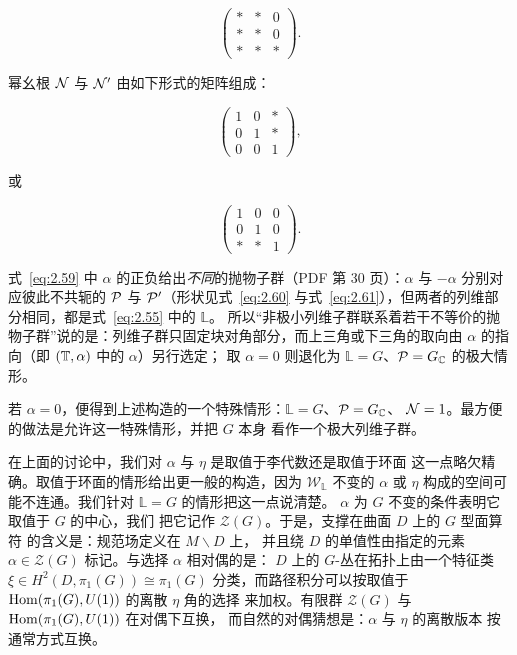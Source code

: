 \setcounter{equation}{60}
\begin{equation}\label{eq:2.61}
  \left(\begin{matrix}* & * & 0 \\
                        * & * & 0\\
                        * & * & * \end{matrix}\right).
\end{equation}

幂幺根 $\mathcal{N}$ 与 $\mathcal{N}'$ 由如下形式的矩阵组成：

\setcounter{equation}{61}
\begin{equation}\label{eq:2.62}
  \left(\begin{matrix}1 & 0 & * \\
                        0 & 1 & * \\
                        0 & 0 & 1 \end{matrix}\right),
\end{equation}

或

\setcounter{equation}{62}
\begin{equation}\label{eq:2.63}
  \left(\begin{matrix}1 & 0 & 0 \\
                        0 & 1 & 0 \\
                        * & * & 1 \end{matrix}\right).
\end{equation}

\begin{yizhu}[易错点]式~\eqref{eq:2.59} 中 $\alpha$ 的正负给出\emph{不同}的抛物子群（PDF 第 30 页）：$\alpha$ 与 $-\alpha$ 分别对应彼此不共轭的
$\mathcal{P}$ 与 $\mathcal{P}'$（形状见式~\eqref{eq:2.60} 与式~\eqref{eq:2.61}），但两者的列维部分相同，都是式~\eqref{eq:2.55} 中的 $\mathbb{L}$。
所以“非极小列维子群联系着若干不等价的抛物子群”说的是：列维子群只固定块对角部分，而上三角或下三角的取向由 $\alpha$ 的指向（即 $({\mathbb{T}},\alpha)$ 中的 $\alpha$）另行选定；
取 $\alpha=0$ 则退化为 $\mathbb{L}=G$、$\mathcal{P}=G_{\mathbb{C}}$ 的极大情形。\end{yizhu}

\bigskip{}

若 $\alpha=0$，便得到上述构造的一个特殊情形：$\mathbb{L}=G$、$\mathcal{P}=G_{\mathbb{C}}$、
$\mathcal{N}=1$。最方便的做法是允许这一特殊情形，并把 $G$ 本身
看作一个极大列维子群。

在上面的讨论中，我们对 $\alpha$ 与 $\eta$ 是取值于李代数还是取值于环面
这一点略欠精确。取值于环面的情形给出更一般的构造，因为
${\mathcal W}_\mathbb{L}$ 不变的 $\alpha$ 或 $\eta$ 构成的空间可能不连通。我们针对
$\mathbb{L}=G$ 的情形把这一点说清楚。
$\alpha$ 为 $G$ 不变的条件表明它取值于 $G$ 的中心，我们
把它记作 ${\mathcal Z}(G)$。于是，支撑在曲面 $D$ 上的 $G$ 型面算符
的含义是：规范场定义在 $M\backslash D$ 上，
并且绕 $D$ 的单值性由指定的元素
$\alpha\in {\mathcal Z}(G)$ 标记。与选择 $\alpha$ 相对偶的是：
$D$ 上的 $G$-丛在拓扑上由一个特征类
$\xi\in H^2(D,\pi_1(G))\cong
\pi_1(G)$ 分类，而路径积分可以按取值于 ${\rm Hom}(\pi_1(G),U(1))$ 的离散 $\eta$ 角的选择
来加权。有限群 ${\mathcal Z}(G)$ 与 ${\rm Hom}(\pi_1(G),U(1))$ 在对偶下互换，
而自然的对偶猜想是：$\alpha$ 与 $\eta$ 的离散版本
按通常方式互换。

